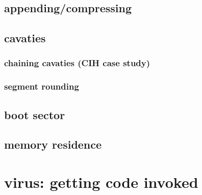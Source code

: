 


\subsection{appending/compressing}





\subsection{cavaties}




\subsubsection{chaining cavaties (CIH case study)}



\subsubsection{segment rounding}


\subsection{boot sector}



\subsection{memory residence}


\section{virus: getting code invoked}

